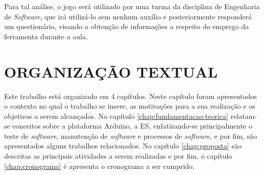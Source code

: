  Para tal análise, o jogo será utilizado por uma turma da disciplina de Engenharia de \textit{Software}, que irá utilizá-lo sem nenhum auxílio e posteriormente responderá um questionário, visando a obtenção de informações a respeito do emprego da ferramenta durante a aula.
 
 \section{ORGANIZAÇÃO TEXTUAL}
 \label{sec:orgTextual}
 
Este trabalho está organizado em 4 capítulos. Neste capítulo foram apresentados o contexto no qual o trabalho se insere, as motivações para a sua realização e os objetivos a serem alcançados. No capítulo \ref{chap:fundamentacao-teorica} relatam-se conceitos sobre a plataforma Arduino, a ES, enfatizando-se principalmente o teste de \textit{software}, manutenção de \textit{software} e processos de \textit{software}, e por fim, são apresentados alguns trabalhos relacionados. No capítulo \ref{chap:proposta} são descritas as principais atividades a serem realizadas e por fim, o capítulo \ref{chap:cronograma} é apresenta o cronograma a ser cumprido.